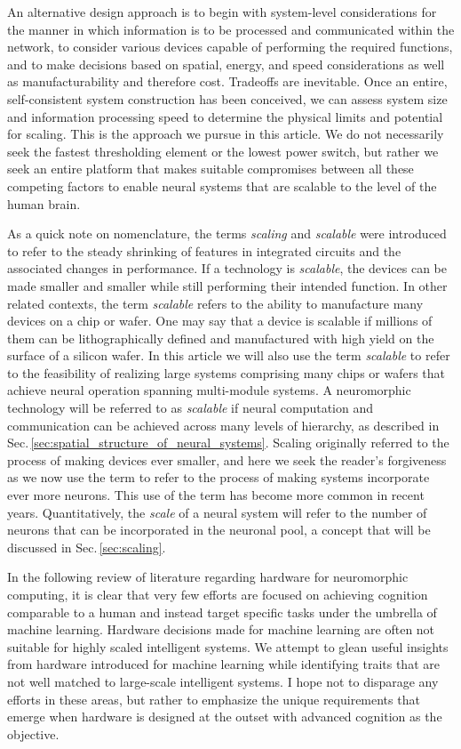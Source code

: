 An alternative design approach is to begin with system-level considerations for the manner in which information is to be processed and communicated within the network, to consider various devices capable of performing the required functions, and to make decisions based on spatial, energy, and speed considerations as well as manufacturability and therefore cost. Tradeoffs are inevitable. Once an entire, self-consistent system construction has been conceived, we can assess system size and information processing speed to determine the physical limits and potential for scaling. This is the approach we pursue in this article. We do not necessarily seek the fastest thresholding element or the lowest power switch, but rather we seek an entire platform that makes suitable compromises between all these competing factors to enable neural systems that are scalable to the level of the human brain.

As a quick note on nomenclature, the terms \textit{scaling} and \textit{scalable} were introduced to refer to the steady shrinking of features in integrated circuits and the associated changes in performance. If a technology is \textit{scalable}, the devices can be made smaller and smaller while still performing their intended function. In other related contexts, the term \textit{scalable} refers to the ability to manufacture many devices on a chip or wafer. One may say that a device is scalable if millions of them can be lithographically defined and manufactured with high yield on the surface of a silicon wafer. In this article we will also use the term \textit{scalable} to refer to the feasibility of realizing large systems comprising many chips or wafers that achieve neural operation spanning multi-module systems. A neuromorphic technology will be referred to as \textit{scalable} if neural computation and communication can be achieved across many levels of hierarchy, as described in Sec.\,\ref{sec:spatial_structure_of_neural_systems}. Scaling originally referred to the process of making devices ever smaller, and here we seek the reader's forgiveness as we now use the term to refer to the process of making systems incorporate ever more neurons. This use of the term has become more common in recent years. Quantitatively, the \textit{scale} of a neural system will refer to the number of neurons that can be incorporated in the neuronal pool, a concept that will be discussed in Sec.\,\ref{sec:scaling}.

In the following review of literature regarding hardware for neuromorphic computing, it is clear that very few efforts are focused on achieving cognition comparable to a human and instead target specific tasks under the umbrella of machine learning. Hardware decisions made for machine learning are often not suitable for highly scaled intelligent systems. We attempt to glean useful insights from hardware introduced for machine learning while identifying traits that are not well matched to large-scale intelligent systems. I hope not to disparage any efforts in these areas, but rather to emphasize the unique requirements that emerge when hardware is designed at the outset with advanced cognition as the objective.

